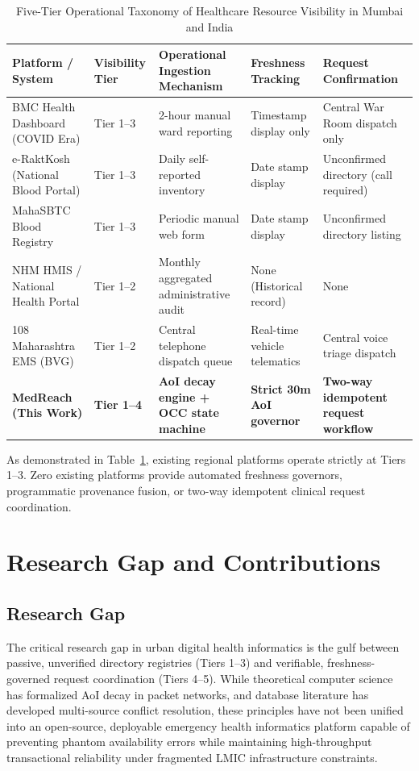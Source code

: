 \documentclass[conference]{IEEEtran}
\begin{document}
\begin{table}[t]
\centering
\caption{Five-Tier Operational Taxonomy of Healthcare Resource Visibility in Mumbai and India}
\label{tab:taxonomy}
\begin{tabularx}{\textwidth}{l p{2.2cm} X p{3.2cm} p{3.6cm}}
\toprule
\textbf{Platform / System} & \textbf{Visibility Tier} & \textbf{Operational Ingestion Mechanism} & \textbf{Freshness Tracking} & \textbf{Request Confirmation} \\
\midrule
BMC Health Dashboard (COVID Era) & Tier 1--3 & 2-hour manual ward reporting & Timestamp display only & Central War Room dispatch only \\
e-RaktKosh (National Blood Portal) & Tier 1--3 & Daily self-reported inventory & Date stamp display & Unconfirmed directory (call required) \\
MahaSBTC Blood Registry & Tier 1--3 & Periodic manual web form & Date stamp display & Unconfirmed directory listing \\
NHM HMIS / National Health Portal & Tier 1--2 & Monthly aggregated administrative audit & None (Historical record) & None \\
108 Maharashtra EMS (BVG) & Tier 1--2 & Central telephone dispatch queue & Real-time vehicle telematics & Central voice triage dispatch \\
\textbf{MedReach (This Work)} & \textbf{Tier 1--4} & \textbf{AoI decay engine + OCC state machine} & \textbf{Strict 30m AoI governor} & \textbf{Two-way idempotent request workflow} \\
\bottomrule
\end{tabularx}
\end{table}

As demonstrated in Table~\ref{tab:taxonomy}, existing regional platforms operate strictly at Tiers 1--3. Zero existing platforms provide automated freshness governors, programmatic provenance fusion, or two-way idempotent clinical request coordination.

\section{Research Gap and Contributions}

\subsection{Research Gap}
The critical research gap in urban digital health informatics is the gulf between passive, unverified directory registries (Tiers 1--3) and verifiable, freshness-governed request coordination (Tiers 4--5). While theoretical computer science has formalized AoI decay in packet networks, and database literature has developed multi-source conflict resolution, these principles have not been unified into an open-source, deployable emergency health informatics platform capable of preventing phantom availability errors while maintaining high-throughput transactional reliability under fragmented LMIC infrastructure constraints.
\end{document}
